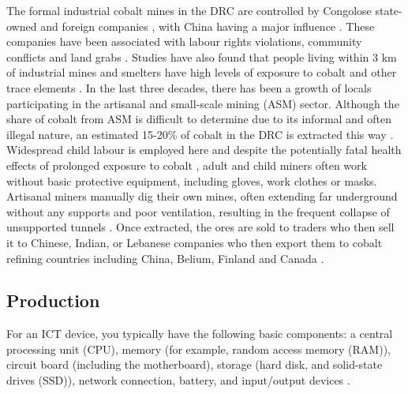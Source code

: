\documentclass{article}
\begin{document}
The formal industrial cobalt mines in the DRC are controlled by Congolose state-owned and foreign companies \cite{scheele2016cobalt}, with China having a major influence \cite{gulley2019china}. These companies have been associated with labour rights violations, community conflicts and land grabs \cite{scheele2016cobalt}. Studies have also found that people living within 3 km of industrial mines and smelters have high levels of exposure to cobalt and other trace elements \cite{banza2009high}. In the last three decades, there has been a growth of locals participating in the artisanal and small-scale mining (ASM) sector. Although the share of cobalt from ASM is difficult to determine due to its informal and often illegal nature, an estimated 15-20\% of cobalt in the DRC is extracted this way \cite{al2017cobalt}. Widespread child labour is employed here \cite{andre2014child} and despite the potentially fatal health effects of prolonged exposure to cobalt \cite{nkulu2018sustainability}, adult and child miners often work without basic protective equipment, including gloves, work clothes or masks.  Artisanal miners manually dig their own mines, often extending far underground without any supports and poor ventilation, resulting in the frequent collapse of unsupported tunnels \cite{al2017cobalt, amnesty2016drc}. Once extracted, the ores are sold to traders who then sell it to Chinese, Indian, or Lebanese companies who then export them to cobalt refining countries including China, Belium, Finland and Canada \cite{al2017cobalt}.


\cleardoublepage
\subsection{Production} \label{SECTION_PRODUCTION}
For an ICT device, you typically have the following basic components: a central processing unit (CPU), memory (for example, random access memory (RAM)), circuit board (including the motherboard), storage (hard disk, and solid-state drives (SSD)), network connection, battery, and input/output devices \cite{bourgeois2014information}.
\end{document}
